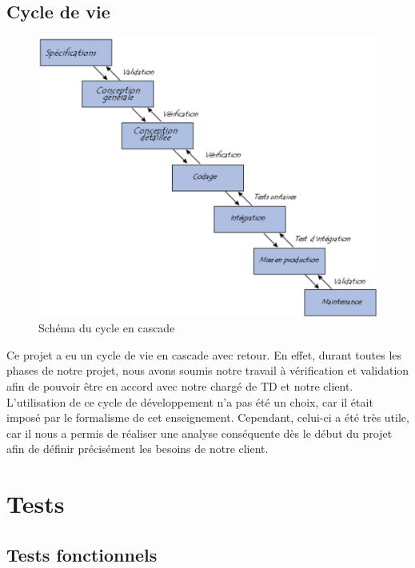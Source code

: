 \documentclass[16pts]{report}
\begin{document}
    \section{Cycle de vie}
    \label{sub:Cycle de vie}

\begin{figure}[H]
	\includegraphics[scale=0.7]{./illustrations/cycle_cascade.png}
	\centering
	\caption{Schéma du cycle en cascade}
	\label{fig:CycleCascade}
\end{figure}

Ce projet a eu un cycle de vie en cascade avec retour. En effet, durant toutes 
les phases de notre projet, nous avons soumis notre travail à vérification 
et validation afin de pouvoir être en accord avec notre chargé de TD et notre 
client. L'utilisation de ce cycle de développement n'a pas été un choix, car 
il était imposé par le formalisme de cet enseignement. Cependant, celui-ci a 
été très utile, car il nous a permis de réaliser une analyse conséquente dès 
le début du projet afin de définir précisément les besoins de notre client.


\chapter{Tests}
\label{cha:Tests}
    \section{Tests fonctionnels}
    \label{sec:Tests fonctionnels}
\end{document}
